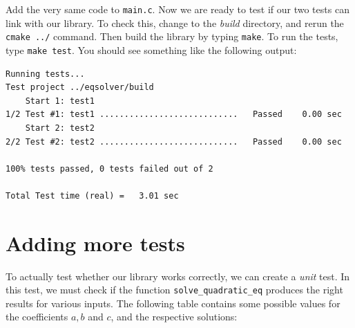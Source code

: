 \documentclass[12pt,a4paper]{article}
\begin{document}
Add the very same code to \verb+main.c+. Now we are ready to test if our two tests can link with our library. To check this, change to the \emph{build} directory, and rerun the \verb+cmake ../+ command. Then build the library by typing \verb+make+. To run the tests, type \verb+make test+. You should see something like the following output:

\begin{Verbatim}
Running tests...
Test project ../eqsolver/build
    Start 1: test1
1/2 Test #1: test1 ............................   Passed    0.00 sec
    Start 2: test2
2/2 Test #2: test2 ............................   Passed    0.00 sec

100% tests passed, 0 tests failed out of 2

Total Test time (real) =   3.01 sec
\end{Verbatim}

\section{Adding more tests}
To actually test whether our library works correctly, we can create a \emph{unit} test. In this test, we must check if the function \verb+solve_quadratic_eq+ produces the right results for various inputs. The following table contains some possible values for the coefficients $a,b$ and $c$, and the respective solutions:
\end{document}
